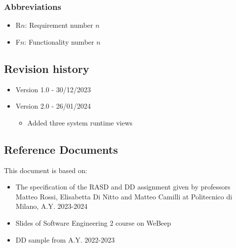 \subsubsection{Abbreviations}
\begin{itemize}
    \item R$n$: Requirement number $n$
    \item F$n$: Functionality number $n$
\end{itemize}

\subsection{Revision history}
\begin{itemize}
    \item Version 1.0 - 30/12/2023
    \item Version 2.0 - 26/01/2024
    \begin{itemize}
        \item Added three system runtime views
    \end{itemize}
\end{itemize}


\subsection{Reference Documents}
This document is based on:
\begin{itemize}
    \item The specification of the RASD and DD assignment given by professors Matteo Rossi, Elisabetta Di Nitto and Matteo Camilli at Politecnico di Milano, A.Y. 2023-2024
    \item Slides of Software Engineering 2 course on WeBeep
    \item DD sample from A.Y. 2022-2023
\end{itemize}

